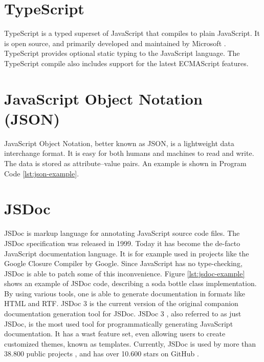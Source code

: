 \section{TypeScript}
TypeScript \cite{typescript} is a typed superset of JavaScript that compiles to plain JavaScript. It is open source, and primarily developed and maintained by Microsoft \cite{microsoft}. TypeScript provides optional static typing to the JavaScript language. The TypeScript compile also includes support for the latest ECMAScript features.

\section{JavaScript Object Notation (JSON)}
JavaScript Object Notation, better known as JSON, is a lightweight data interchange format. It is easy for both humans and machines to read and write. The data is stored as attribute–value pairs. An example is shown in Program Code \ref{lst:json-example}.


\section{JSDoc}
JSDoc is markup language for annotating JavaScript source code files. The JSDoc specification was released in 1999. Today it has become the de-facto JavaScript documentation language. It is for example used in projects like the Google Closure Compiler \cite{google-closure-compiler} by Google. Since JavaScript has no type-checking, JSDoc is able to patch some of this inconvenience. Figure \ref{lst:jsdoc-example} shows an example of JSDoc code, describing a soda bottle class implementation. By using various tools, one is able to generate documentation in formats like HTML and RTF. JSDoc 3 is the current version of the original companion documentation generation tool for JSDoc. JSDoc 3 \cite{jsdoc-3}, also referred to as just JSDoc, is the most used tool for programmatically generating JavaScript documentation. It has a wast feature set, even allowing users to create customized themes, known as templates. Currently, JSDoc is used by more than 38.800 public projects \cite{jsdoc-used-by}, and has over 10.600 stars on GitHub \cite{jsdoc-stargazers}.





